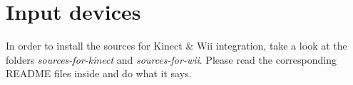 \section{Input devices}

In order to install the sources for Kinect \& Wii integration, take a look at the folders \emph{sources-for-kinect} and \emph{sources-for-wii}. Please read the corresponding README files inside and do what it says.
